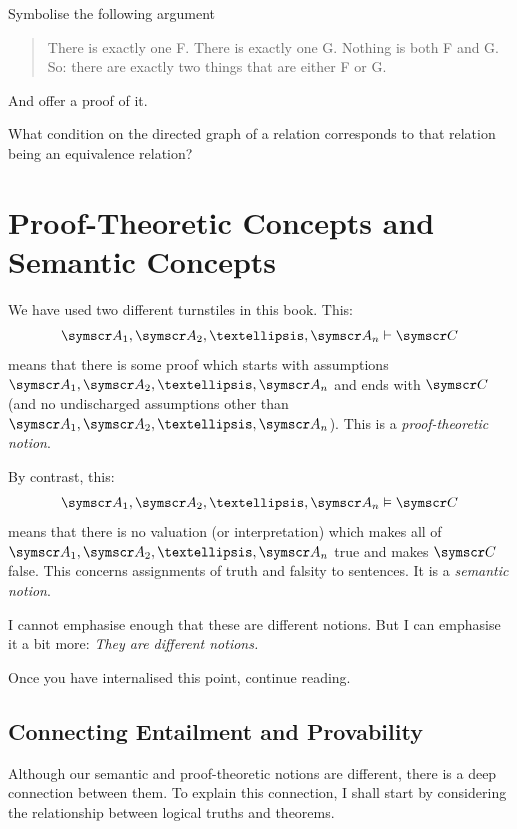 \problempart
Symbolise the following argument
	\begin{quote}
		There is exactly one F. There is exactly one G. Nothing is both F and G. So: there are exactly two things that are either F or G.
	\end{quote}
And offer a proof of it.

\problempart
What condition on the directed graph of a relation corresponds to that relation being an equivalence relation?

\chapter{Proof-Theoretic Concepts and Semantic Concepts}\label{sec:soundcomp}
We have used two different turnstiles in this book.  This:
$$\meta{A}_1, \meta{A}_2, …, \meta{A}_n \proves \meta{C}$$
means that there is some proof which starts with assumptions $\meta{A}_1, \meta{A}_2, …, \meta{A}_n$ and ends with $\meta{C}$ (and no undischarged assumptions other than $\meta{A}_1, \meta{A}_2, …, \meta{A}_n$). This is a \emph{proof-theoretic notion}.

By contrast, this:
$$\meta{A}_1, \meta{A}_2, …, \meta{A}_n \entails \meta{C}$$
means that there is no valuation (or interpretation) which makes all of $\meta{A}_1, \meta{A}_2, …, \meta{A}_n$ true and makes $\meta{C}$ false. This concerns assignments of truth and falsity to sentences. It is a \emph{semantic notion}.

I cannot emphasise enough that these are different notions. But I can emphasise it a bit more: \emph{They are different notions.}

Once you have internalised this point, continue reading. 

\section{Connecting Entailment and Provability}

Although our semantic and proof-theoretic notions are different, there is a deep connection between them. To explain this connection, I shall start by considering the relationship between logical truths and theorems.

